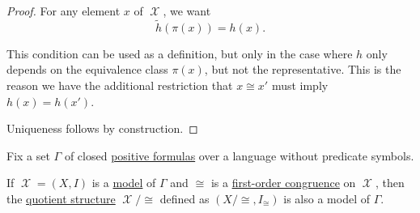 \begin{proof}
  For any element \( x \) of \( \mscrX \), we want
  \begin{equation*}
    \widetilde{h}(\pi(x)) = h(x).
  \end{equation*}

  This condition can be used as a definition, but only in the case where \( h \) only depends on the equivalence class \( \pi(x) \), but not the representative. This is the reason we have the additional restriction that \( x \cong x' \) must imply \( h(x) = h(x') \).

  Uniqueness follows by construction.
\end{proof}

\begin{proposition}\label{thm:quotient_preserves_positive_formulas}
  Fix a set \( \Gamma \) of closed \hyperref[def:positive_formula]{positive formulas} over a language without predicate symbols.

  If \( \mscrX = (X, I) \) is a \hyperref[def:first_order_model]{model} of \( \Gamma \) and \( \cong \) is a \hyperref[def:first_order_congruence]{first-order congruence} on \( \mscrX \), then the \hyperref[def:first_order_quotient]{quotient structure} \( \mscrX / {\cong} \) defined as \( (X / {\cong}, I_\cong) \) is also a model of \( \Gamma \).
\end{proposition}
